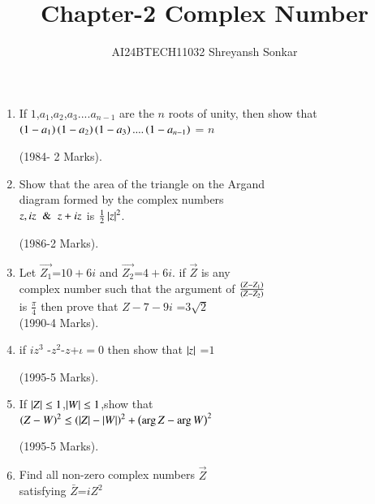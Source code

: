 \documentclass[journal]{IEEEtran}
\theoremstyle{remark}
\begin{document}

\vspace{3cm}

\title{Chapter-2 Complex Number}
\author{AI24BTECH11032 Shreyansh Sonkar
}
\maketitle
\newpage
\bigskip

\renewcommand{\thefigure}{\theenumi}
\renewcommand{\thetable}{\theenumi}
\begin{enumerate}[start=7] %

\item If $1$,$a_1$,$a_2$,$a_3$....$a_{n-1}$
 are the $n$  roots of unity, then show that $\left(1-a_1\right)\left(1-a_2\right)\left(1-a_3\right)....\left(1-a_{n-1}\right)$ = $n$  
 
  \hfill (1984- 2 Marks).\\

\item Show that the area of the 
  triangle on the Argand\\ 
  diagram formed by the complex 
  numbers\\
  $z,  iz \And z+  iz$ 
  is $\frac{1}{2}\left\vert z\right\vert^2$.

  \hfill (1986-2 Marks).\\
\item Let $\vec{Z_1}$=$10+6i$ and $\vec{Z_2}$=$4+6i$. if $\vec{Z}$ is any \\
complex number such that the argument of ${\frac{\left(Z-Z_1\right)}{\left(Z-Z_2
\right)}}$\\
is  ${\frac{\pi}{4}}$ then prove that $Z-7-9i$ =$3\sqrt{2}$\\

 \hfill(1990-4 Marks).\\
\item if {$iz^{3}$ -$z^2$-$z$+$\iota=0$} then show that $\left\vert z\right\vert$ =$1$

\hfill(1995-5 Marks).\\
\item If $\left\vert Z\right\vert\le1$,$\left\vert W\right\vert\le1$,show that\\
$\left(Z-W\right)^2\le\left(\left\vert Z\right\vert-\left\vert W\right\vert\right)^2+\left(\arg Z-\arg W\right)^2$ 

\hfill(1995-5 Marks). \\
\item Find all non-zero complex numbers $\vec{Z}$ \\
satisfying $\bar Z$=$ iZ^2 $ 


\end{enumerate}
\end{document}
